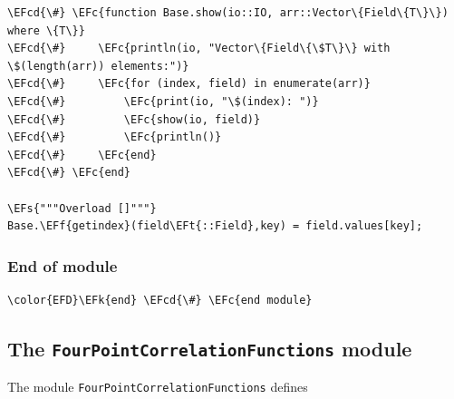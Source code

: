 \documentclass[a4paper]{article}
\numberwithin{equation}{section}
\newcommand{\EFc}[1]{\textcolor{EFc}{#1}} %
\newcommand{\EFcd}[1]{\textcolor{EFcd}{#1}} %
\newcommand{\EFs}[1]{\textcolor{EFs}{#1}} %
\newcommand{\EFk}[1]{\textcolor{EFk}{#1}} %
\newcommand{\EFf}[1]{\textcolor{EFf}{#1}} %
\newcommand{\EFt}[1]{\textcolor{EFt}{#1}} %
\begin{document}
\begin{itemize}
\begin{Code}
\begin{Verbatim}
\EFcd{\#} \EFc{function Base.show(io::IO, arr::Vector\{Field\{T\}\}) where \{T\}}
\EFcd{\#}     \EFc{println(io, "Vector\{Field\{\$T\}\} with \$(length(arr)) elements:")}
\EFcd{\#}     \EFc{for (index, field) in enumerate(arr)}
\EFcd{\#}         \EFc{print(io, "\$(index): ")}
\EFcd{\#}         \EFc{show(io, field)}
\EFcd{\#}         \EFc{println()}
\EFcd{\#}     \EFc{end}
\EFcd{\#} \EFc{end}

\EFs{"""Overload []"""}
Base.\EFf{getindex}(field\EFt{::Field},key) = field.values[key];
\end{Verbatim}
\end{Code}
\end{itemize}
\subsubsection*{End of module}
\label{sec:org0735638}

\begin{Code}
\begin{Verbatim}
\color{EFD}\EFk{end} \EFcd{\#} \EFc{end module}
\end{Verbatim}
\end{Code}
\subsection{The \texttt{FourPointCorrelationFunctions} module}
\label{sec:org2d1cc33}
The module \texttt{FourPointCorrelationFunctions} defines
\end{document}
